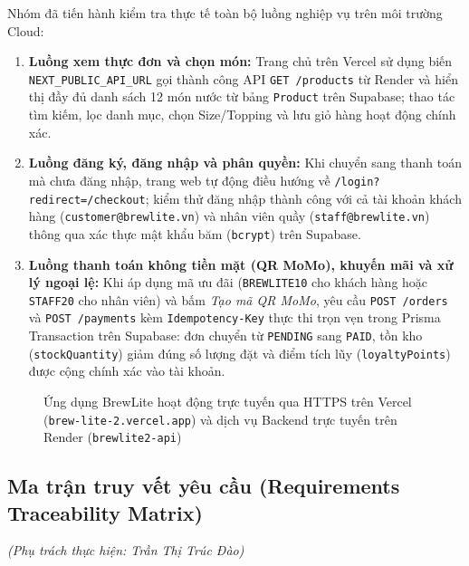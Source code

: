 Nhóm đã tiến hành kiểm tra thực tế toàn bộ luồng nghiệp vụ trên môi trường Cloud:
\begin{enumerate}
    \item \textbf{Luồng xem thực đơn và chọn món:} Trang chủ trên Vercel sử dụng biến \texttt{NEXT\_PUBLIC\_API\_URL} gọi thành công API \texttt{GET /products} từ Render và hiển thị đầy đủ danh sách 12 món nước từ bảng \texttt{Product} trên Supabase; thao tác tìm kiếm, lọc danh mục, chọn Size/Topping và lưu giỏ hàng hoạt động chính xác.
    \item \textbf{Luồng đăng ký, đăng nhập và phân quyền:} Khi chuyển sang thanh toán mà chưa đăng nhập, trang web tự động điều hướng về \texttt{/login?redirect=/checkout}; kiểm thử đăng nhập thành công với cả tài khoản khách hàng (\texttt{customer@brewlite.vn}) và nhân viên quầy (\texttt{staff@brewlite.vn}) thông qua xác thực mật khẩu băm (\texttt{bcrypt}) trên Supabase.
    \item \textbf{Luồng thanh toán không tiền mặt (QR MoMo), khuyến mãi và xử lý ngoại lệ:} Khi áp dụng mã ưu đãi (\texttt{BREWLITE10} cho khách hàng hoặc \texttt{STAFF20} cho nhân viên) và bấm \textit{Tạo mã QR MoMo}, yêu cầu \texttt{POST /orders} và \texttt{POST /payments} kèm \texttt{Idempotency-Key} thực thi trọn vẹn trong Prisma Transaction trên Supabase: đơn chuyển từ \texttt{PENDING} sang \texttt{PAID}, tồn kho (\texttt{stockQuantity}) giảm đúng số lượng đặt và điểm tích lũy (\texttt{loyaltyPoints}) được cộng chính xác vào tài khoản.
\end{enumerate}

\begin{figure}[H]
\centering
{}
\caption{Ứng dụng BrewLite hoạt động trực tuyến qua HTTPS trên Vercel (\texttt{brew-lite-2.vercel.app}) và dịch vụ Backend trực tuyến trên Render (\texttt{brewlite2-api})}
\end{figure}

\subsection{Ma trận truy vết yêu cầu (Requirements Traceability Matrix)}
\textit{(Phụ trách thực hiện: Trần Thị Trúc Đào)}

